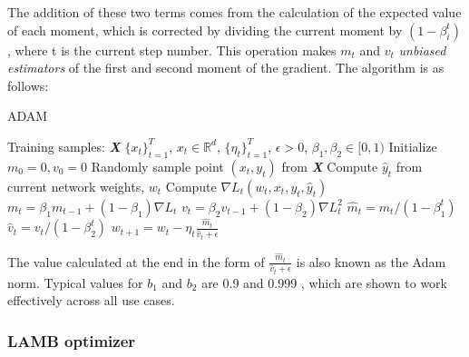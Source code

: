The addition of these two terms comes from the calculation of the expected value of each moment, which is corrected by dividing the current moment by $(1 - \beta_i^t)$, where t is the current step number. This operation makes $m_t$ and $v_t$ \textit{unbiased estimators} of the first and second moment of the gradient. The algorithm is as follows:
\begin{minipage}[b]{.48\textwidth}
\begin{algorithm}[H]\small
	\caption{ADAM \cite{adam}}
	\label{alg:adam}
	\begin{algorithmic}
		 Training samples: \textbf{\textit{X}} \subset $\{x_t\}_{t=1}^T$, $x_t \in \mathbb{R}^d$, $\{\eta_t\}_{t=1}^T$, $\epsilon>0$,  $\beta_{1},\beta_{2} \in [0,1)$
		\vspace{3pt}
		\STATE Initialize $m_{0} = 0, v_{0} = 0$
		\vspace{3pt}
		\STATE Randomly sample point $(x_t,y_t)$ from \textbf{\textit{X}}
		\vspace{3pt}
		\STATE Compute $\hat y_t$ from current network weights, $w_t$
		\vspace{3pt}
		\STATE Compute $\nabla L_t(w_t, x_{t}, y_t,\hat y_t)$
		\vspace{3pt}
        \STATE $m_{t} = \beta_{1}m_{t-1}+(1-\beta_{1})\nabla L_t$
        \vspace{3pt}
        \STATE $v_{t} = \beta_{2}v_{t-1}+(1-\beta_{2})\nabla L_t^2$
        \vspace{3pt}
        \STATE $\hat{m}_{t}={m_t}/(1-\beta_1^t)$
        \vspace{3pt}
        \STATE $\hat{v}_{t}={v_t}/(1-\beta_2^t)$
        \vspace{2pt}
        \STATE $w_{t+1} = w_{t}-\eta_t\frac{\hat{m}_t}{\hat{v}_t+\epsilon}$
        \vspace{3pt}
		\ENDFOR
	\end{algorithmic}
\end{algorithm}
\end{minipage}\hfill%

The value calculated at the end in the form of $\frac{\hat{m}_t}{\hat{v}_t+\epsilon}$ is also known as the Adam norm. Typical values for $b_1$ and $b_2$ are 0.9 and 0.999 \cite{adam}, which are shown to work effectively across all use cases.

\subsubsection{LAMB optimizer}


